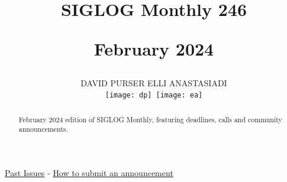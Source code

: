 \documentclass[prodmode,acmtecs]{acmsmall} %
\newcounter{colstart}
\begin{document}
\setcounter{colstart}{\thepage}

\title{{\huge\sc SIGLOG Monthly 246}

 February 2024}
\author{DAVID PURSER
ELLI ANASTASIADI
\vspace*{-2.6cm}\begin{flushright}\texttt{[image: dp]}\ \texttt{[image: ea]}\end{flushright}
}


\begin{abstract}
February 2024 edition of SIGLOG Monthly, featuring deadlines, calls and community announcements.
\end{abstract}


\maketitlee

\href{https://lics.siglog.org/newsletters/}{Past Issues}
 - 
\href{https://lics.siglog.org/newsletters/inst.html}{How to submit an announcement}
\end{document}
